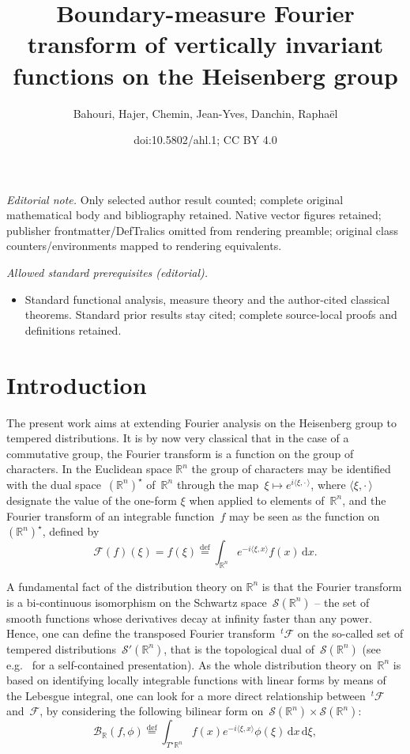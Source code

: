 \documentclass[10pt]{amsart}
\title{Boundary-measure Fourier transform of vertically invariant functions on the Heisenberg group}
\author{Bahouri, Hajer, Chemin, Jean-Yves, Danchin, Raphaël}
\date{doi:10.5802/ahl.1; CC BY 4.0}
\theoremstyle{definition}\newtheorem{defi}[theo]{Definition}\newtheorem{rema}[theo]{Remark}\newtheorem{exam}[theo]{Example}\newtheorem{exem}[theo]{Example}\newtheorem{nota}[theo]{Notation}
\newcommand{\wh}{\widehat}
\newcommand*\cB{\mathcal{B}}
\newcommand*\cF{\mathcal{F}}
\newcommand*\cS{\mathcal{S}}
\newcommand*\R{\mathbb{R}}
\newcommand*\eqdefa{\overset{\mathrm{def}}{=}}
\newcommand*{\dd}{\mathrm{d}}
\newcommand{\dx}{\dd x}
\newcommand{\dxi}{\dd \xi}
\begin{document}
\maketitle
\noindent\textit{Editorial note.} Only selected author result counted; complete original mathematical body and bibliography retained. Native vector figures retained; publisher frontmatter/DefTralics omitted from rendering preamble; original class counters/environments mapped to rendering equivalents.\par\medskip
\noindent\textit{Allowed standard prerequisites (editorial).}\begin{itemize}
\item Standard functional analysis, measure theory and the author-cited classical theorems. Standard prior results stay cited; complete source-local proofs and definitions retained.
\end{itemize}\medskip

\section{Introduction}

The present work aims at extending Fourier analysis on the Heisenberg group to tempered distributions. It is by now very classical that in the case of a commutative group, the Fourier transform is a function on the group of characters. In the Euclidean space $\R^n$ the group of characters may be identified with the dual space~$(\R^n)^\star$ of~$\R^n$ through the map~$\xi \mapsto e^{i\langle \xi,{\cdot\,}\rangle}$, where $\langle \xi,{\cdot\,}\rangle$ designate the value of the one-form $\xi$ when applied to elements of~$\R^n$, and the Fourier transform of an integrable function~$f$ may be seen as the function on $(\R^n)^\star$, defined by
\begin{equation}\label{definFourierclassic}
\cF (f) (\xi) = \wh f(\xi)\eqdefa \int_{\R^n} e^{-i\langle \xi,x\rangle } f(x)\, \dx.
\end{equation}

A fundamental fact of the distribution theory on $\R^n$ is that the Fourier transform is a bi-continuous isomorphism on the Schwartz space~$\cS(\R^n)$ -- the set of smooth functions whose derivatives decay at infinity faster than any power. Hence, one can define the transposed Fourier transform~${}^t\!\cF$ on the so-called set of tempered distributions~$\cS'(\R^n)$, that is the topological dual of~$\cS(\R^n)$ (see e.g.~\cite{rudin, S} for a self-contained presentation). As the whole distribution theory on~$\R^n$ is based on identifying locally integrable functions with linear forms by means of the Lebesgue integral, one can look for a more direct relationship between~${}^t\!\cF$ and~$\cF$, by considering the following bilinear form on~$\cS(\R^n)\times\cS(\R^n)$:
\begin{equation}\label{definFourierRbilin}
\cB_\R (f,\phi)\eqdefa \int_{T^\star \R^n} f(x) e^{-i\langle \xi,x\rangle} \phi(\xi) \,\dx \,\dxi,
\end{equation}
\end{document}
